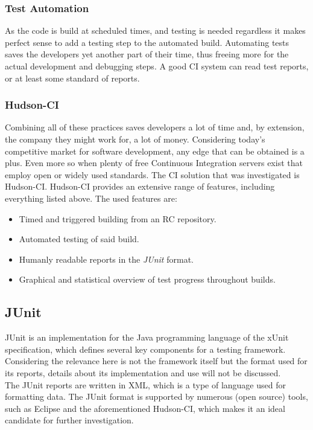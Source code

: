 \documentclass[11pt,british]{article}
\begin{document}
\subsubsection{Test Automation}
As the code is build at scheduled times, and testing is needed regardless it makes perfect sense to add a testing step to the automated build. Automating tests saves the developers yet another part of their time, thus freeing more for the actual development and debugging steps. A good \gls{CI} system can read test reports, or at least some standard of reports. 

\subsubsection{Hudson-CI}
Combining all of these practices saves developers a lot of time and, by extension, the company they might work for, a lot of money. Considering today's competitive market for software development, any edge that can be obtained is a plus. Even more so when plenty of free Continuous Integration servers exist that employ open or widely used standards. The \gls{CI} solution that was investigated is Hudson-CI. Hudson-CI provides an extensive range of features, including everything listed above. The used features are:
\begin{itemize}
\item Timed and triggered building from an \gls{RC} repository.
\item Automated testing of said build.
\item Humanly readable reports in the \emph{JUnit} format.
\item Graphical and statistical overview of test progress throughout builds.
\end{itemize}

\subsection{JUnit}
\label{subsec:JUnit}
JUnit is an implementation for the Java programming language of the xUnit specification, which defines several key components for a testing framework. Considering the relevance here is not the framework itself but the format used for its reports, details about its implementation and use will not be discussed.\\
The JUnit reports are written in \gls{XML}, which is a type of language used for formatting data. The JUnit format is supported by numerous (open source) tools, such as Eclipse and the aforementioned Hudson-CI, which makes it an ideal candidate for further investigation. 
\end{document}

